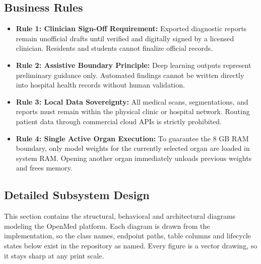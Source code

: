 \documentclass[12pt,a4paper]{report}
\begin{document}
\subsection{Business Rules}
\begin{itemize}[leftmargin=1.2em]
    \item \textbf{Rule 1: Clinician Sign-Off Requirement:} Exported diagnostic reports remain unofficial drafts until verified and digitally signed by a licensed clinician. Residents and students cannot finalize official records.
    \item \textbf{Rule 2: Assistive Boundary Principle:} Deep learning outputs represent preliminary guidance only. Automated findings cannot be written directly into hospital health records without human validation.
    \item \textbf{Rule 3: Local Data Sovereignty:} All medical scans, segmentations, and reports must remain within the physical clinic or hospital network. Routing patient data through commercial cloud APIs is strictly prohibited.
    \item \textbf{Rule 4: Single Active Organ Execution:} To guarantee the 8 GB RAM boundary, only model weights for the currently selected organ are loaded in system RAM. Opening another organ immediately unloads previous weights and frees memory.
\end{itemize}

\subsection{Detailed Subsystem Design}
This section contains the structural, behavioral and architectural diagrams modeling the OpenMed platform. Each diagram is drawn from the implementation, so the class names, endpoint paths, table columns and lifecycle states below exist in the repository as named. Every figure is a vector drawing, so it stays sharp at any print scale.
\end{document}

